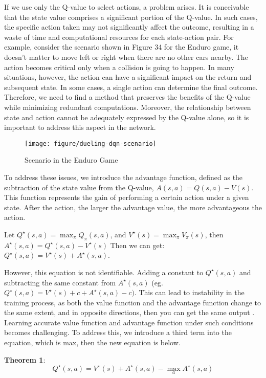 \documentclass{article}
\begin{document}
If we use only the Q-value to select actions, a problem arises. It is conceivable that the state value comprises a significant portion of the Q-value. In such cases, the specific action taken may not significantly affect the outcome, resulting in a waste of time and computational resources for each state-action pair. For example, consider the scenario shown in Figure 34 for the Enduro game, it doesn't matter to move left or right when there are no other cars nearby. The action becomes critical only when a collision is going to happen.  In many situations, however, the action can have a significant impact on the return and subsequent state. In some cases, a single action can determine the final outcome. Therefore, we need to find a method that preserves the benefits of the Q-value while minimizing redundant computations. Moreover, the relationship between state and action cannot be adequately expressed by the Q-value alone, so it is important to address this aspect in the network.

\begin{figure}[htbp]
        \centering
        \texttt{[image: figure/dueling-dqn-scenario]}
        \caption{Scenario in the Enduro Game}
\end{figure}


To address these issues, we introduce the advantage function, defined as the subtraction of the state value from the Q-value, $A(s,a) = Q(s,a) - V(s)$. This function represents the gain of performing a certain action under a given state. After the action, the larger the advantage value, the more advantageous the action.

Let $Q^{\star}(s, a)=\max _\pi Q_\pi(s, a)$, and $V^{\star}(s)=\max _\pi V_\pi(s)$, then $A^{\star}(s,a) = Q^{\star}(s,a) - V^{\star}(s)$
Then we can get: $Q^{\star}(s,a) = V^{\star}(s) + A^{\star}(s,a)$.

However, this equation is not identifiable. Adding a constant to $Q^{\star}(s,a)$ and subtracting the same constant from $A^{\star}(s,a)$ (eg. $Q^{\star}(s,a) = V^{\star}(s) + c + A^{\star}(s,a) -c )$. This can lead to instability in the training process, as both the value function and the advantage function change to the same extent, and in opposite directions, then you can get the same output . Learning accurate value function and advantage function under such conditions becomes challenging. To address this, we introduce a third term into the equation, which is max, then the new equation is below.

\textbf{Theorem 1}:
\begin{equation}
Q^{\star}(s,a) = V^{\star}(s) + A^{\star}(s,a) - \max_a A^{\star}(s,a)
\end{equation}
\end{document}
